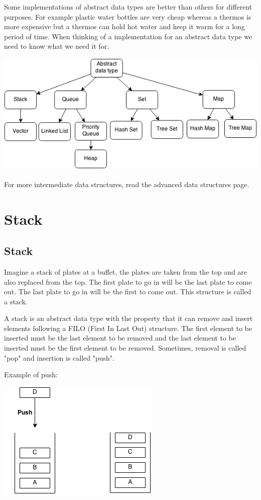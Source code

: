 \documentclass[11pt,oneside]{book}
\makeatletter
\def\maxwidth#1{\ifdim\Gin@nat@width>#1 #1\else\Gin@nat@width\fi}
\makeatother
\begin{document}
Some implementations of abstract data types are better than others for different purposes. For example plastic water bottles are very cheap whereas a thermos is more expensive but a thermos can hold hot water and keep it warm for a long period of time. When thinking of a implementation for an abstract data type we need to know what we need it for.

\includegraphics[width=\maxwidth{\textwidth}]{adt.png}

For more intermediate data structures, read the advanced data structures page.


    \chapter{ Stack }
        \section{ Stack }
        

Imagine a stack of plates at a buffet, the plates are taken from the top and are also replaced from the top. The first plate to go in will be the last plate to come out. The last plate to go in will be the first to come out. This structure is called a stack.

A stack is an abstract data type with the property that it can remove and insert elements following a FILO (First In Last Out) structure. The first element to be inserted must be the last element to be removed and the last element to be inserted must be the first element to be removed. Sometimes, removal is called "pop" and insertion is called "push".

Example of push:

\includegraphics[width=\maxwidth{\textwidth}]{stack.png}
\end{document}
